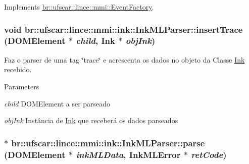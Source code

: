 Implements \hyperlink{classbr_1_1ufscar_1_1lince_1_1mmi_1_1EventFactory_a19ad2165726a29a55c921f569764290b}{br::ufscar::lince::mmi::EventFactory}.

\hypertarget{classbr_1_1ufscar_1_1lince_1_1mmi_1_1ink_1_1InkMLParser_ab2fdfc15cb9334ff037f2e49dd41fe42}{
\subsubsection[{insertTrace}]{\setlength{\rightskip}{0pt plus 5cm}void br::ufscar::lince::mmi::ink::InkMLParser::insertTrace (DOMElement $\ast$ {\em child}, \/  {\bf Ink} $\ast$ {\em objInk})}}
\label{classbr_1_1ufscar_1_1lince_1_1mmi_1_1ink_1_1InkMLParser_ab2fdfc15cb9334ff037f2e49dd41fe42}


Faz o parser de uma tag \char`\"{}trace\char`\"{} e acrescenta os dados no objeto da Classe \hyperlink{classbr_1_1ufscar_1_1lince_1_1mmi_1_1ink_1_1Ink}{Ink} recebido. 


\begin{DoxyParams}{Parameters}
\item[{\em child}]DOMElement a ser parseado \item[{\em objInk}]Instância de \hyperlink{classbr_1_1ufscar_1_1lince_1_1mmi_1_1ink_1_1Ink}{Ink} que receberá os dados parseados \end{DoxyParams}
\hypertarget{classbr_1_1ufscar_1_1lince_1_1mmi_1_1ink_1_1InkMLParser_a77a83c6281e610f692254e0e2e96f956}{
\subsubsection[{parse}]{$\ast$ br::ufscar::lince::mmi::ink::InkMLParser::parse (DOMElement $\ast$ {\em inkMLData}, \/  {\bf InkMLError} $\ast$ {\em retCode})}}
\label{classbr_1_1ufscar_1_1lince_1_1mmi_1_1ink_1_1InkMLParser_a77a83c6281e610f692254e0e2e96f956}


